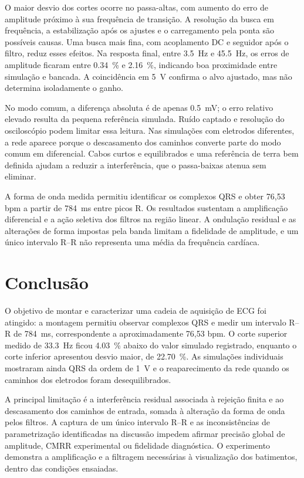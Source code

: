 \documentclass[11pt,a4paper]{article}
\begin{document}
O maior desvio dos cortes ocorre no passa-altas, com aumento do erro de amplitude próximo à sua frequência de transição. A resolução da busca em frequência, a estabilização após os ajustes e o carregamento pela ponta são possíveis causas. Uma busca mais fina, com acoplamento DC e seguidor após o filtro, reduz esses efeitos. Na resposta final, entre \SI{3,5}{\hertz} e \SI{45,5}{\hertz}, os erros de amplitude ficaram entre \SI{0,34}{\percent} e \SI{2,16}{\percent}, indicando boa proximidade entre simulação e bancada. A coincidência em \SI{5}{\volt} confirma o alvo ajustado, mas não determina isoladamente o ganho.

No modo comum, a diferença absoluta é de apenas \SI{0,5}{\milli\volt}; o erro relativo elevado resulta da pequena referência simulada. Ruído captado e resolução do osciloscópio podem limitar essa leitura. Nas simulações com eletrodos diferentes, a rede aparece porque o descasamento dos caminhos converte parte do modo comum em diferencial. Cabos curtos e equilibrados e uma referência de terra bem definida ajudam a reduzir a interferência, que o passa-baixas atenua sem eliminar.

A forma de onda medida permitiu identificar os complexos QRS e obter 76,53 bpm a partir de \SI{784}{\milli\second} entre picos R. Os resultados sustentam a amplificação diferencial e a ação seletiva dos filtros na região linear. A ondulação residual e as alterações de forma impostas pela banda limitam a fidelidade de amplitude, e um único intervalo R--R não representa uma média da frequência cardíaca.

\section{Conclusão}

O objetivo de montar e caracterizar uma cadeia de aquisição de ECG foi atingido: a montagem permitiu observar complexos QRS e medir um intervalo R--R de \SI{784}{\milli\second}, correspondente a aproximadamente 76,53 bpm. O corte superior medido de \SI{33,3}{\hertz} ficou \SI{4,03}{\percent} abaixo do valor simulado registrado, enquanto o corte inferior apresentou desvio maior, de \SI{22,70}{\percent}. As simulações individuais mostraram ainda QRS da ordem de \SI{1}{\volt} e o reaparecimento da rede quando os caminhos dos eletrodos foram desequilibrados.

A principal limitação é a interferência residual associada à rejeição finita e ao descasamento dos caminhos de entrada, somada à alteração da forma de onda pelos filtros. A captura de um único intervalo R--R e as inconsistências de parametrização identificadas na discussão impedem afirmar precisão global de amplitude, CMRR experimental ou fidelidade diagnóstica. O experimento demonstra a amplificação e a filtragem necessárias à visualização dos batimentos, dentro das condições ensaiadas.
\end{document}
